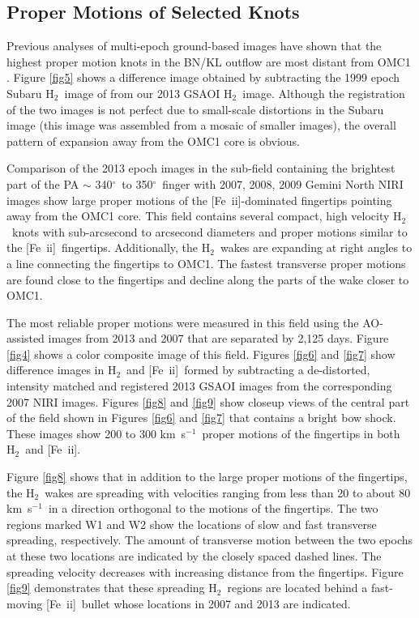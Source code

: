 \documentclass{aa}
\newcommand\arcdeg{\mbox{$^\circ$}\xspace}  %
\newcommand{\kms}{km~s{$^{-1}$}}
\newcommand{\Feii}{[Fe~{\sc ii}]}
\newcommand{\hh}{\ensuremath{\textrm{H}_{2}}}			%
\begin{document}
\subsection{Proper Motions of Selected Knots}

Previous analyses of  multi-epoch ground-based images have shown that the highest 
proper  motion knots in  the BN/KL outflow are most distant from OMC1 \citep{JonesWalker1985,LeeBurton2000,Bally2011}.  
Figure \ref{fig5} shows a difference image obtained  by subtracting the 1999 epoch 
Subaru \hh\  image of \citet{Kaifu2000} from our 2013  GSAOI \hh\   image.    Although the
registration of the two images is not perfect due to small-scale distortions in the Subaru image
(this image was assembled from a mosaic of smaller images), the overall pattern
of expansion away from the OMC1 core is obvious.

Comparison of the 2013 epoch images in the sub-field containing the brightest part of the
PA $\sim$ 340\arcdeg\ to 350\arcdeg\  finger with 2007, 2008, 2009 Gemini North 
NIRI images show large proper motions of  the \Feii -dominated fingertips pointing
away from the OMC1 core.   This field contains  several compact, high velocity  \hh\  
knots with sub-arcsecond to arcsecond diameters and proper motions similar to
the \Feii\  fingertips.      Additionally, the \hh\ wakes are expanding at right angles
to a line connecting the fingertips to OMC1.    The fastest transverse proper motions 
are found close to the fingertips and decline along the parts of the wake closer to OMC1.

The most reliable proper motions were measured in this field using
the AO-assisted images from  2013 and 2007 that are separated by 2,125 days.  
Figure \ref{fig4} shows a color composite image of this field.  
Figures \ref{fig6} and  \ref{fig7}  show  difference images in   \hh\  and \Feii\  
formed by subtracting a de-distorted, intensity matched and registered
2013 GSAOI images from the corresponding 2007 NIRI images.  
Figures \ref{fig8} and \ref{fig9}  show closeup views of the central part of the
field shown in  Figures \ref{fig6} and \ref{fig7} that contains a bright bow shock. 
These  images show 200 to 300 \kms\ proper motions of the fingertips
in both \hh\ and \Feii .  
 
Figure \ref{fig8}   shows  that in addition to the large proper motions of the 
fingertips,  the \hh\ wakes are spreading with velocities 
ranging from less than 20 to about 80 \kms\  in a direction orthogonal to the motions 
of the  fingertips.     The two regions marked W1 and W2 show
the locations of slow and fast transverse spreading, respectively. 
The amount of transverse motion between the two epochs at these two 
locations are indicated by the  closely spaced dashed lines. 
The spreading velocity decreases with increasing distance from the fingertips. 
Figure \ref{fig9}  demonstrates that these spreading \hh\ regions are located 
behind a  fast-moving \Feii\ bullet whose locations in 2007 and 2013 are indicated.
\end{document}
